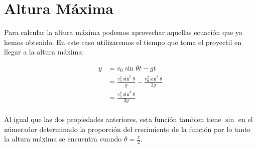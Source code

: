 \section{Altura Máxima}
\label{sec:altura_maxima}


Para calcular la altura máxima podemos aprovechar aquellas ecuación que ya
hemos obtenido. En este caso utilizaremos el tiempo que toma el proyectil en
llegar a la altura máxima:

\begin{align*}
    y &=  v_{0}\sin\theta t - gt \\
      &= \frac{v_{0}^{2}\sin^{2}\theta}{g}-\frac{v_{0}^{2}\sin^{2}\theta}{2g} \\
      &= \frac{v_{0}^{2}\sin^{2}\theta}{2g} \\
\end{align*}

Al igual que las dos propiedades anteriores, esta función tambien tiene
\(\sin\) en el númerador determinado la proporción del crecimiento de la
función por lo tanto la altura máxima se encuentra cuando \(\theta =
\frac{\pi}{2}\).






















